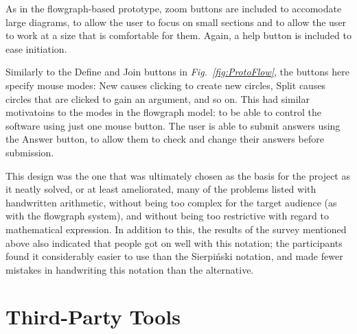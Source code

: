 \documentclass[12pt,twoside,notitlepage,xetex]{report}
\begin{document}
As in the flowgraph-based prototype, zoom buttons are included to accomodate large diagrams, to allow the user to focus on small sections and to allow the user to work at a size that is comfortable for them.  Again, a help button is included to ease initiation.

Similarly to the {\sfapp Define} and {\sfapp Join} buttons in \emph{Fig.~\ref{fig:ProtoFlow}}, the buttons here specify mouse modes: {\sfapp New} causes clicking to create new circles, {\sfapp Split} causes circles that are clicked to gain an argument, and so on. This had similar motivatoins to the modes in the flowgraph model: to be able to control the software using just one mouse button.  The user is able to submit answers using the {\sfapp Answer} button, to allow them to check and change their answers before submission.

This design was the one that was ultimately chosen as the basis for the project as it neatly solved, or at least ameliorated, many of the problems listed with handwritten arithmetic, without being too complex for the target audience (as with the flowgraph system), and without being too restrictive with regard to mathematical expression.  In addition to this, the results of the survey mentioned above also indicated that people got on well with this notation; the participants found it considerably easier to use than the Sierpiński notation, and made fewer mistakes in handwriting this notation than the alternative.




\section{Third-Party Tools}
\end{document}
